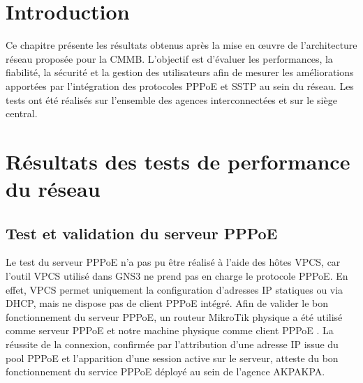 {}

\section*{Introduction}
Ce chapitre présente les résultats obtenus après la mise en œuvre de l’architecture 
réseau proposée pour la \gls{CMMB}. 
L’objectif est d’évaluer les performances, la fiabilité, la sécurité et la gestion des 
utilisateurs afin de mesurer les améliorations apportées par l’intégration des protocoles 
\gls{PPPoE} et \gls{SSTP} au sein du réseau. 
Les tests ont été réalisés sur l’ensemble des agences interconnectées et sur le siège 
central.


\section{Résultats des tests de performance du réseau }
\label{subsec:interfaces-doc}


\subsection{Test et validation du serveur PPPoE }
\label{subsubsec:interfaces-doc-api}
Le test du serveur \gls{PPPoE} n’a pas pu être réalisé à l’aide des hôtes VPCS, car 
l’outil VPCS utilisé dans GNS3 ne prend pas en charge le protocole \gls{PPPoE}. En effet, 
VPCS permet uniquement la configuration d’adresses \gls{IP} statiques ou via DHCP, mais 
ne dispose pas de client \gls{PPPoE} intégré. 
Afin de valider le bon fonctionnement du serveur \gls{PPPoE}, un routeur MikroTik 
physique a été utilisé comme serveur \gls{PPPoE} et notre machine physique comme client 
\gls{PPPoE} .  
La réussite de la connexion, confirmée par l’attribution d’une adresse \gls{IP} issue du pool 
\gls{PPPoE} et l’apparition d’une session active sur le serveur, atteste du bon 
fonctionnement du service \gls{PPPoE} déployé au sein de l’agence AKPAKPA. 


